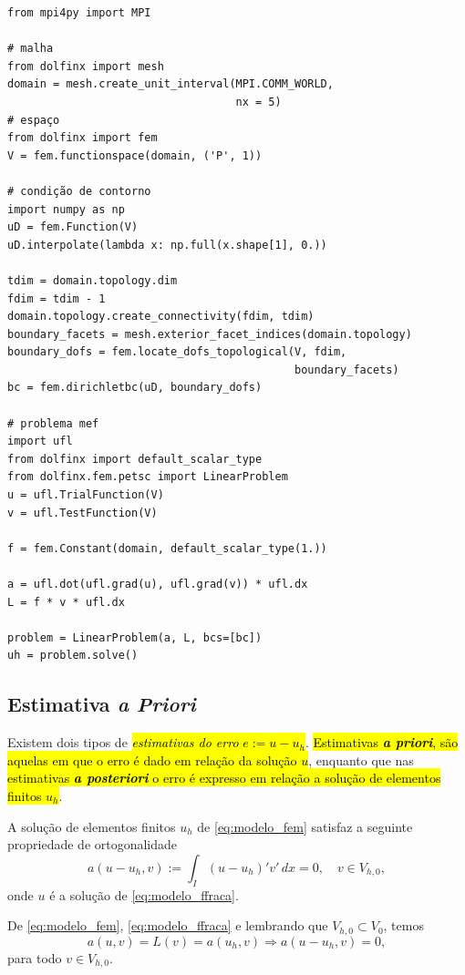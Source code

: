 \begin{ex}
\begin{lstlisting}[caption=ex\_mef1d\_modelo.py]
from mpi4py import MPI

# malha
from dolfinx import mesh
domain = mesh.create_unit_interval(MPI.COMM_WORLD,
                                   nx = 5)
# espaço
from dolfinx import fem
V = fem.functionspace(domain, ('P', 1))

# condição de contorno
import numpy as np
uD = fem.Function(V)
uD.interpolate(lambda x: np.full(x.shape[1], 0.))

tdim = domain.topology.dim
fdim = tdim - 1
domain.topology.create_connectivity(fdim, tdim)
boundary_facets = mesh.exterior_facet_indices(domain.topology)
boundary_dofs = fem.locate_dofs_topological(V, fdim,
                                            boundary_facets)
bc = fem.dirichletbc(uD, boundary_dofs)

# problema mef
import ufl
from dolfinx import default_scalar_type
from dolfinx.fem.petsc import LinearProblem
u = ufl.TrialFunction(V)
v = ufl.TestFunction(V)

f = fem.Constant(domain, default_scalar_type(1.))

a = ufl.dot(ufl.grad(u), ufl.grad(v)) * ufl.dx
L = f * v * ufl.dx

problem = LinearProblem(a, L, bcs=[bc])
uh = problem.solve()
\end{lstlisting}
\end{ex}

\subsection{Estimativa \textit{a Priori}}

Existem dois tipos de \hl{\emph{estimativas do erro} $e := u - u_h$}. \hl{Estimativas \textbf{\textit{a priori}}, são aquelas em que o erro é dado em relação da solução $u$}, enquanto que nas \hl{estimativas \textbf{\textit{a posteriori}} o erro é expresso em relação a solução de elementos finitos $u_h$}.

\begin{teo}\label{teo:ortogonalidade_de_Galerkin}
  A solução de elementos finitos $u_h$ de \eqref{eq:modelo_fem} satisfaz a seguinte propriedade de ortogonalidade
  \begin{equation}
    a(u-u_h,v) := \int_I (u-u_h)'v'\,dx = 0,\quad v\in V_{h,0},
  \end{equation}
onde $u$ é a solução de \eqref{eq:modelo_ffraca}.
\end{teo}
\begin{dem}
  De \eqref{eq:modelo_fem}, \eqref{eq:modelo_ffraca} e lembrando que $V_{h,0}\subset V_0$, temos
  \begin{equation}
    a(u,v) = L(v) = a(u_h,v) \Rightarrow a(u-u_h, v) = 0,
  \end{equation}
para todo $v\in V_{h,0}$.
\end{dem}

